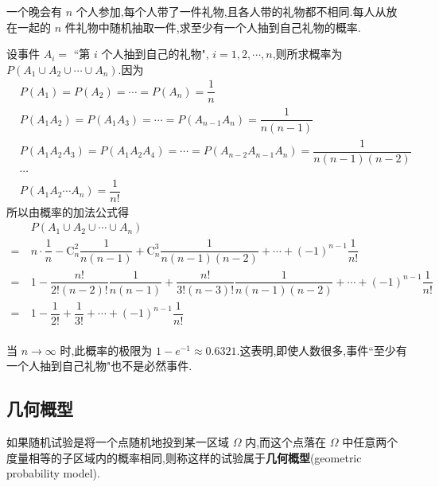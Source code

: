 \begin{example}[][配对问题]
    \indent 一个晚会有 $n$ 个人参加,每个人带了一件礼物,且各人带的礼物都不相同.每人从放在一起的 $n$ 件礼物中随机抽取一件,求至少有一个人抽到自己礼物的概率.
\end{example}

\begin{solution}
    设事件 $A_i=$ ``第 $i$ 个人抽到自己的礼物", $i=1,2,\cdots,n$,则所求概率为 $P(A_1 \cup A_2 \cup \cdots \cup A_n)$.因为
    $$
    \begin{aligned}
        & P(A_1) = P(A_2) = \cdots = P(A_n) = \dfrac{1}{n} \\
        & P(A_1 A_2) = P(A_1 A_3) = \cdots = P(A_{n-1} A_n) = \dfrac{1}{n(n-1)} \\
        & P(A_1 A_2 A_3) = P(A_1 A_2 A_4) = \cdots = P(A_{n-2} A_{n-1} A_n) = \dfrac{1}{n(n-1)(n-2)} \\
        & \cdots \\
        & P(A_1 A_2 \cdots A_n) = \dfrac{1}{n!}
    \end{aligned}
    $$
    所以由概率的加法公式得
    $$
    \begin{aligned}
        & P(A_1 \cup A_2 \cup \cdots \cup A_n) \\
        =\ & n \cdot \dfrac{1}{n} - \mathrm{C}_n^2 \dfrac{1}{n(n-1)} + \mathrm{C}_n^3 \dfrac{1}{n(n-1)(n-2)} + \cdots + (-1)^{n-1} \dfrac{1}{n!} \\
        =\ & 1 - \dfrac{n!}{2! (n-2)!} \dfrac{1}{n(n-1)} + \dfrac{n!}{3! (n-3)!} \dfrac{1}{n(n-1)(n-2)} + \cdots + (-1)^{n-1} \dfrac{1}{n!} \\
        =\ & 1 - \dfrac{1}{2!} + \dfrac{1}{3!} + \cdots + (-1)^{n-1} \dfrac{1}{n!} \\
    \end{aligned}
    $$
\end{solution}

\begin{note}
    \indent 当 $n \to \infty$ 时,此概率的极限为 $1 - e^{-1} \approx 0.6321$.这表明,即使人数很多,事件``至少有一个人抽到自己礼物"也不是必然事件.
\end{note}

\subsection{几何概型}

如果随机试验是将一个点随机地投到某一区域 $\varOmega$ 内,而这个点落在 $\varOmega$ 中任意两个度量相等的子区域内的概率相同,则称这样的试验属于\textbf{几何概型}(geometric probability model).

